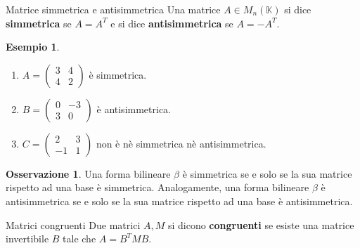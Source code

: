 \documentclass[a4paper]{article}
\theoremstyle{definition}
\newtheorem*{oss}{Osservazione}
\newtheorem*{es}{Esempio}
\begin{document}
	\begin{deff}{Matrice simmetrica e antisimmetrica}{}
		Una matrice $A \in M_n(\mathbb{K})$ si dice \textbf{simmetrica} se $A = A^T$ e si dice \textbf{antisimmetrica} se $A = -A^T$.
	\end{deff}

	\begin{es}
		\begin{enumerate}
			\item $A = \begin{pmatrix}
				3 & 4 \\
				4 & 2
			\end{pmatrix}$ è simmetrica.
			\item $B = \begin{pmatrix}
				0 & -3 \\
				3 & 0
			\end{pmatrix}$ è antisimmetrica.
			\item $C = \begin{pmatrix}
				2 & 3 \\
				-1 & 1
			\end{pmatrix}$ non è nè simmetrica nè antisimmetrica.
		\end{enumerate}
	\end{es}
	\begin{oss}
		Una forma bilineare $\beta$ è simmetrica se e solo se la sua matrice rispetto ad una base è simmetrica.
		Analogamente, una forma bilineare $\beta$ è antisimmetrica se e solo se la sua matrice rispetto ad una base è antisimmetrica.
	\end{oss}

	\begin{deff}{Matrici congruenti}{}
		Due matrici $A, M$ si dicono \textbf{congruenti} se esiste una matrice invertibile $B$ tale che $A = B^TMB$.
	\end{deff}
\end{document}
